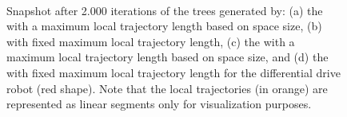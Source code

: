 \begin{figure} [t!]
    \centering
    \\
    \caption{Snapshot after 2.000 iterations of the trees generated by: (a) the  with a maximum local trajectory length based on space size, (b)  with fixed maximum local trajectory length, (c) the  with a maximum local trajectory length based on space size, and (d) the  with fixed maximum local trajectory length for the differential drive robot (red shape).
    Note that the local trajectories (in orange) are represented as linear segments only for visualization purposes.}%
    \label{fig:unic_tree}%
\end{figure}

